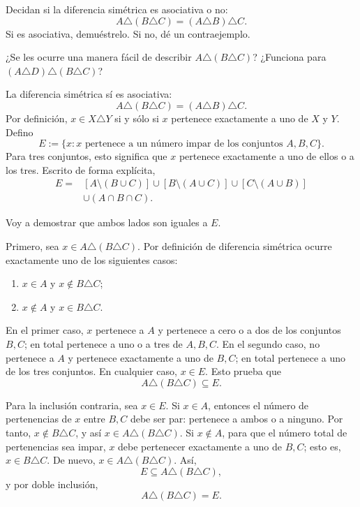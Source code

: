 \documentclass[11pt]{article}
\begin{document}
\begin{question}
Decidan si la diferencia simétrica es asociativa o no:
\[
A\triangle(B\triangle C)=(A\triangle B)\triangle C.
\]
Si es asociativa, demuéstrelo. Si no, dé un contraejemplo.

¿Se les ocurre una manera fácil de describir $A\triangle(B\triangle C)$? ¿Funciona para $(A\triangle D)\triangle(B\triangle C)$?
\end{question}

\begin{solution}
La diferencia simétrica sí es asociativa:
\[
\boxed{A\triangle(B\triangle C)=(A\triangle B)\triangle C}.
\]
Por definición, $x\in X\triangle Y$ si y sólo si $x$ pertenece exactamente a
uno de $X$ y $Y$. Defino
\[
E:=\{x:x\text{ pertenece a un número impar de los conjuntos }A,B,C\}.
\]
Para tres conjuntos, esto significa que $x$ pertenece exactamente a uno de ellos o a los tres. Escrito de forma explícita,
\begin{align*}
E={}&[A\setminus(B\cup C)]\cup[B\setminus(A\cup C)]
\cup[C\setminus(A\cup B)]\\
&\cup(A\cap B\cap C).
\end{align*}

Voy a demostrar que ambos lados son iguales a $E$.

Primero, sea $x\in A\triangle(B\triangle C)$. Por definición de diferencia
simétrica ocurre exactamente uno de los siguientes casos:
\begin{enumerate}
  \item $x\in A$ y $x\notin B\triangle C$;
  \item $x\notin A$ y $x\in B\triangle C$.
\end{enumerate}
En el primer caso, $x$ pertenece a $A$ y pertenece a cero o a dos de los
conjuntos $B,C$; en total pertenece a uno o a tres de $A,B,C$. En el segundo
caso, no pertenece a $A$ y pertenece exactamente a uno de $B,C$; en total
pertenece a uno de los tres conjuntos. En cualquier caso, $x\in E$. Esto prueba
que
\[
A\triangle(B\triangle C)\subseteq E.
\]

Para la inclusión contraria, sea $x\in E$. Si $x\in A$, entonces el número de
pertenencias de $x$ entre $B,C$ debe ser par: pertenece a ambos o a ninguno.
Por tanto, $x\notin B\triangle C$, y así
$x\in A\triangle(B\triangle C)$. Si $x\notin A$, para que el número total de
pertenencias sea impar, $x$ debe pertenecer exactamente a uno de $B,C$; esto es,
$x\in B\triangle C$. De nuevo, $x\in A\triangle(B\triangle C)$. Así,
\[
E\subseteq A\triangle(B\triangle C),
\]
y por doble inclusión,
\[
A\triangle(B\triangle C)=E.
\]


\end{solution}
\end{document}
